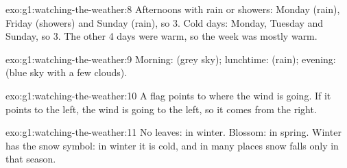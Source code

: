 \begin{solution}{exo:g1:watching-the-weather:8}
Afternoons with rain or showers: Monday (rain), Friday (showers) and Sunday (rain), so 3.
Cold days: Monday, Tuesday and Sunday, so 3. The other 4 days were warm, so
the week was mostly warm.
\end{solution}

\begin{solution}{exo:g1:watching-the-weather:9}
Morning:  (grey sky); lunchtime:  (rain);
evening:  (blue sky with a few clouds).
\end{solution}

\begin{solution}{exo:g1:watching-the-weather:10}
A flag points to where the wind is going. If it points to the left, the
wind is going to the left, so it comes from the right.
\end{solution}

\begin{solution}{exo:g1:watching-the-weather:11}
No leaves: in winter. Blossom: in spring. Winter has the snow symbol: in
winter it is cold, and in many places snow falls only in that season.
\end{solution}
